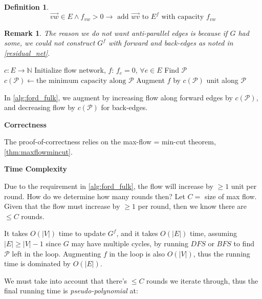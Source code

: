 \documentclass{article}
\newtheorem{remark}{Remark}
\theoremstyle{definition}
\newtheorem{definition}{Definition}[section]
\begin{document}
\begin{definition}
\label{def:add_back_edge_unsat_2_resid}
$$\overrightarrow{vw} \in E \land f_{vw} > 0 \to \text{ add } \overrightarrow{wv} \text { to } E^f \text { with capacity } f_{vw}$$
\end{definition}

\begin{remark}
The reason we do not want anti-parallel edges is because if $G$ had some, we could not construct $G^f$ with forward and back-edges as noted in \ref{residual_net}.
\end{remark}

\begin{algorithm}[H]
\caption{$FordFulkerson$}
\label{alg:ford_fulk}
\begin{algorithmic}[1]
	\REQUIRE $c : E \to \mathbb{N}$ 
	\STATE Initialize flow network, $f$: $f_e = 0, \, \forall e \in E$
		\STATE Find $\mathcal{P}$
		\STATE $c(\mathcal{P}) \gets \text{the minimum capacity along } \mathcal{P}$
		\STATE Augment $f$ by $c(\mathcal{P})$ unit along $\mathcal{P}$
	\ENDWHILE
\end{algorithmic}
\end{algorithm}

In \ref{alg:ford_fulk}, we augment by increasing flow along forward edges by $c(\mathcal{P})$, and decreasing flow by $c(\mathcal{P})$ for back-edges. 

\textbf{Correctness}

The proof-of-correctness relies on the max-flow = min-cut theorem, \ref{thm:maxflowmincut}. 

\textbf{Time Complexity}

Due to the requirement in \ref{alg:ford_fulk}, the flow will increase by $\geq 1$ unit per round. How do we determine how many rounds then? Let $C=$ size of max flow. Given that the flow must increase by $\geq 1$ per round, then we know there are $\leq C$ rounds. 

It takes $O(|V|)$ time to update $G^f$, and it takes $O(|E|)$ time, assuming $|E| \geq |V|-1$ since $G$ may have multiple cycles, by running $DFS$ or $BFS$ to find $\mathcal{P}$ left in the loop. Augmenting $f$ in the loop is also $O(|V|)$, thus the running time is dominated by $O(|E|)$. 

We must take into account that there's $\leq C$ rounds we iterate through, thus the final running time is \textit{pseudo-polynomial} at:
\end{document}

